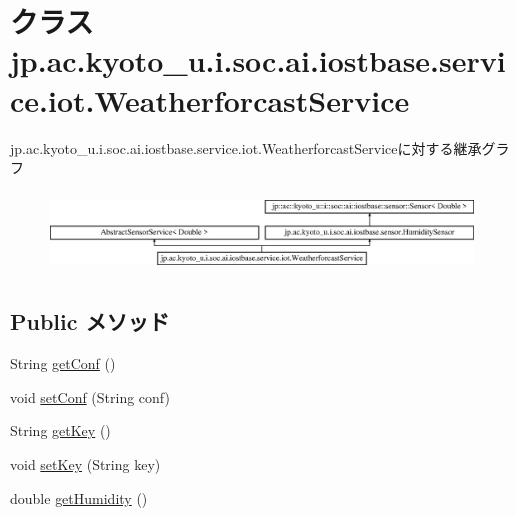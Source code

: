 \hypertarget{classjp_1_1ac_1_1kyoto__u_1_1i_1_1soc_1_1ai_1_1iostbase_1_1service_1_1iot_1_1_weatherforcast_service}{\section{クラス jp.\-ac.\-kyoto\-\_\-u.\-i.\-soc.\-ai.\-iostbase.\-service.\-iot.\-Weatherforcast\-Service}
\label{classjp_1_1ac_1_1kyoto__u_1_1i_1_1soc_1_1ai_1_1iostbase_1_1service_1_1iot_1_1_weatherforcast_service}
}
jp.\-ac.\-kyoto\-\_\-u.\-i.\-soc.\-ai.\-iostbase.\-service.\-iot.\-Weatherforcast\-Serviceに対する継承グラフ\begin{figure}[H]
\begin{center}
\leavevmode
\includegraphics[height=2.164948cm]{classjp_1_1ac_1_1kyoto__u_1_1i_1_1soc_1_1ai_1_1iostbase_1_1service_1_1iot_1_1_weatherforcast_service}
\end{center}
\end{figure}
\subsection*{Public メソッド}
\begin{DoxyCompactItemize}
\item 
String \hyperlink{classjp_1_1ac_1_1kyoto__u_1_1i_1_1soc_1_1ai_1_1iostbase_1_1service_1_1iot_1_1_weatherforcast_service_a0c7417eecaea07d31daad7c3fbcce134}{get\-Conf} ()
\item 
void \hyperlink{classjp_1_1ac_1_1kyoto__u_1_1i_1_1soc_1_1ai_1_1iostbase_1_1service_1_1iot_1_1_weatherforcast_service_aadb943c230207ff79ae22700fa813136}{set\-Conf} (String conf)
\item 
String \hyperlink{classjp_1_1ac_1_1kyoto__u_1_1i_1_1soc_1_1ai_1_1iostbase_1_1service_1_1iot_1_1_weatherforcast_service_a8991a621e8d9c075ad017f3ff36646f9}{get\-Key} ()
\item 
void \hyperlink{classjp_1_1ac_1_1kyoto__u_1_1i_1_1soc_1_1ai_1_1iostbase_1_1service_1_1iot_1_1_weatherforcast_service_a9d3aee6031e0f609e2da1274f3191652}{set\-Key} (String key)
\item 
double \hyperlink{classjp_1_1ac_1_1kyoto__u_1_1i_1_1soc_1_1ai_1_1iostbase_1_1service_1_1iot_1_1_weatherforcast_service_a2635b09c784a1c1f6353e7118f3b99c5}{get\-Humidity} ()
\end{DoxyCompactItemize}


